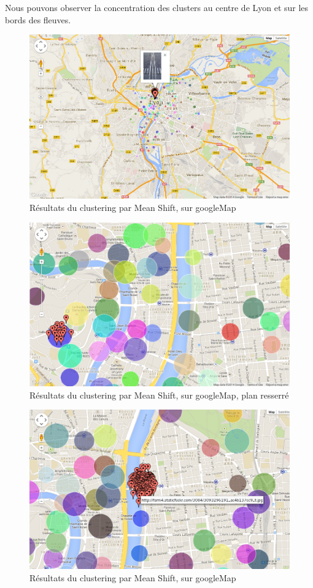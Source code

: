Nous pouvons observer la concentration des clusters au centre de Lyon et sur les bords des fleuves.

\begin{figure}[H]
    \centering
    \includegraphics[width=\linewidth]{img/ggmap_3.png}
    \caption{Résultats du clustering par Mean Shift, sur googleMap}
\end{figure}

\begin{figure}[H]
    \centering
    \includegraphics[width=\linewidth]{img/ggmap_2.png}
    \caption{Résultats du clustering par Mean Shift, sur googleMap, plan resserré}
\end{figure}

\begin{figure}[H]
    \centering
    \includegraphics[width=\linewidth]{img/ggmap_4.png}
    \caption{Résultats du clustering par Mean Shift, sur googleMap}
\end{figure}

